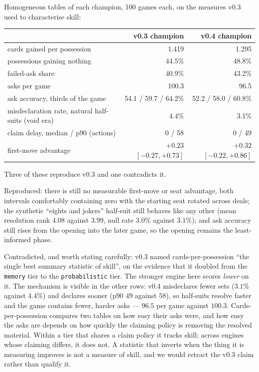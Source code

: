 \documentclass[11pt,a4paper]{article}
\begin{document}
Homogeneous tables of each champion, 100 games each, on the measures v0.3 used
to characterise skill:

\begin{center}
\small
\begin{tabular}{lrr}
\toprule
& v0.3 champion & v0.4 champion \\
\midrule
cards gained per possession & 1.419 & 1.295 \\
possessions gaining nothing & 44.5\% & 48.8\% \\
failed-ask share & 40.9\% & 43.2\% \\
asks per game & 100.3 & 96.5 \\
ask accuracy, thirds of the game & 54.1 / 59.7 / 64.2\% & 52.2 / 58.0 / 60.8\% \\
misdeclaration rate, natural half-suits (void era) & 4.4\% & 3.1\% \\
claim delay, median / p90 (actions) & 0 / 58 & 0 / 49 \\
first-move advantage & $+0.23$ $[-0.27, +0.73]$ & $+0.32$ $[-0.22, +0.86]$ \\
\bottomrule
\end{tabular}
\end{center}

Three of these reproduce v0.3 and one contradicts it.

Reproduced: there is still no measurable first-move or seat advantage, both
intervals comfortably containing zero with the starting seat rotated across
deals; the synthetic ``eights and jokers'' half-suit still behaves like any
other (mean resolution rank $4.08$ against $3.99$, null rate $3.0\%$ against
$3.1\%$); and ask accuracy still rises from the opening into the later game,
so the opening remains the least-informed phase.

Contradicted, and worth stating carefully: v0.3 named cards-per-possession
``the single best summary statistic of skill'', on the evidence that it doubled
from the \texttt{memory} tier to the \texttt{probabilistic} tier. The stronger
engine here scores \emph{lower} on it. The mechanism is visible in the other
rows: v0.4 misdeclares fewer sets ($3.1\%$ against $4.4\%$) and declares sooner (p90 $49$
against $58$), so half-suits resolve faster and the game contains fewer, harder
asks --- $96.5$ per game against $100.3$. Cards-per-possession compares two
tables on how easy their asks were, and how easy the asks are depends on how
quickly the claiming policy is removing the resolved material. Within a tier
that shares a claim policy it tracks skill; across engines whose claiming
differs, it does not. A statistic that inverts when the thing it is measuring
improves is not a measure of skill, and we would retract the v0.3 claim rather
than qualify it.
\end{document}
